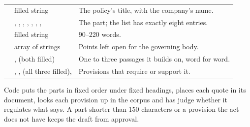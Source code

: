 \par\nopagebreak
\begin{xltabular}{\textwidth}{@{}L{36mm}L{38mm}Y@{}}
\toprule
{} &  &  \\
\midrule
\endhead
\bottomrule
\endlastfoot
{} & filled string & The policy's title, with the company's name. \\
 & , , , , , , ,  & The part; the list has exactly eight entries. \\
 & filled string & 90--220 words. \\
 & array of strings & Points left open for the governing body. \\
 & ,  (both filled) & One to three passages it builds on, word for word. \\
 & , ,  (all three filled),  & Provisions that require or support it. \\
\end{xltabular}

Code puts the parts in fixed order under fixed headings, places each quote in its document,
looks each provision up in the corpus and has  judge whether it
regulates what  says. A part shorter than 150 characters or a provision the act does
not have keeps the draft from approval.

